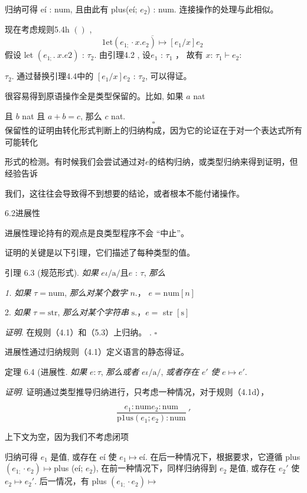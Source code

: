 归纳可得 eí : num, 且由此有 plus(eí; $e_{2}$) : num. 连接操作的处理与此相似。

现在考虑规则5.4h $()$ ,
$$
\overline{1\mathrm{e}\mathrm{t}(e_{1;}\cdot x.e_{2})\mapsto[e_{1}/x]e_{2}}\ 
$$
假设 let $(e_{1;}.\ x.e2)$ : $\tau_{2}$. 由引理4.2 , 设$e_{1}$ : $\tau_{1}$ ， 故有 $x$: $\tau_{1} \vdash e_{2}$:

$\tau_{2}$. 通过替换引理4.4中的 $[e_{1}/x]e_{2}$ : $\tau_{2}$, 可以得证。

很容易得到原语操作全是类型保留的。比如, 如果 $a$ nat

且 $b$ nat 且 $a+b=c$, 那么 $c$ nat.
$$
\square 
$$
保留性的证明由转化形式判断上的归纳构成，因为它的论证在于对一个表达式所有可能转化

形式的检测。有时候我们会尝试通过对$e$的结构归纳，或类型归纳来得到证明，但经验告诉


我们，这往往会导致得不到想要的结论，或者根本不能付诸操作。


6.2进展性

进展性理论持有的观点是良类型程序不会 “中止”。

证明的关键是以下引理，它们描述了每种类型的值。

引理 6.3 (规范形式). {\it 如果} $e\iota/\mathrm{a}/且 e$ : $\tau$, {\it 那么}

{\it 1. 如果} $\tau=\mathrm{n}\mathrm{u}\mathrm{m}$, {\it 那么对某个数字} $n.$， $e=\mathrm{n}\mathrm{u}\mathrm{m}[n]$ 

2. {\it 如果} $\tau=\mathrm{s}\mathrm{t}\mathrm{r}$, {\it 那么对某个字符串} $\mathrm{s}.$，$e=$ str $[\mathrm{s}]$ 

{\it 证明}. 在规则（4.1）和（5.3）上归纳。 . $\square $

进展性通过归纳规则（4.1）定义语言的静态得证。

定理 6.4 (进展性. {\it 如果} $ e:\tau$, {\it 那么或者} $e\iota/\mathrm{a}/$, {\it 或者存在} $e'$ {\it 使} $e\mapsto e'.$

{\it 证明}. 证明通过类型推导归纳进行，只考虑一种情况，对于规则（4.1d），

$$
\frac{e_{1}:\mathrm{n}\mathrm{u}\mathrm{m}e_{2}:\mathrm{n}\mathrm{u}\mathrm{m}}{\mathrm{p}1\mathrm{u}\mathrm{s}(e_{1};e_{2}):\mathrm{n}\mathrm{u}\mathrm{m}}\ '
$$

上下文为空，因为我们不考虑闭项

归纳可得 $e_{1}$ 是值, 或存在 eí 使 $e_{1} \mapsto$eí. 在后一种情况下，根据要求，它遵循 plus $(e_{1;}\cdot e_{2}) \mapsto$plus (eí; $e_{2}$), 在前一种情况下，同样归纳得到 $e_{2}$ 是值, 或存在 $e_{2}'$ 使 $e_{2} \mapsto e_{2}'$. 后一情况，有 plus $(e_{1;}\cdot e_{2}) \mapsto$

